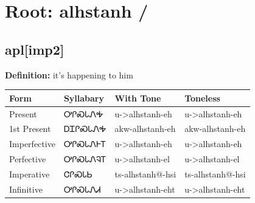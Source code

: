 \documentclass{article}%
\begin{document}
%
\normalsize%
\section*{Root: alhstanh / }%
\subsection*{apl[imp2]}%
\textbf{Definition: }%
it’s happening to him%
\\[0.5em]%
\begin{tabular}{|l|l|l|l|}%
\hline%
\textbf{Form}&\textbf{Syllabary}&\textbf{With Tone}&\textbf{Toneless}\\%
\hline%
Present&ᎤᎵᏍᏓᏁᎭ&u{-}>alhstanh{-}eh&u{-}>alhstanh{-}eh\\%
1st Present&ᎠᏆᎵᏍᏓᏁᎭ&akw{-}alhstanh{-}eh&akw{-}alhstanh{-}eh\\%
Imperfective&ᎤᎵᏍᏓᏁᎰᎢ&u{-}>alhstanh{-}eh&u{-}>alhstanh{-}eh\\%
Perfective&ᎤᎵᏍᏓᏁᎸᎢ&u{-}>alhstanh{-}el&u{-}>alhstanh{-}el\\%
Imperative&ᏣᎵᏍᏓᏏ&ts{-}alhstanh@{-}hsi&ts{-}alhstanh@{-}hsi\\%
Infinitive&ᎤᎵᏍᏓᏁᏗ&u{-}>alhstanh{-}eht&u{-}>alhstanh{-}eht\\%
\hline%
\end{tabular}%
\\[1em]%
\end{document}
